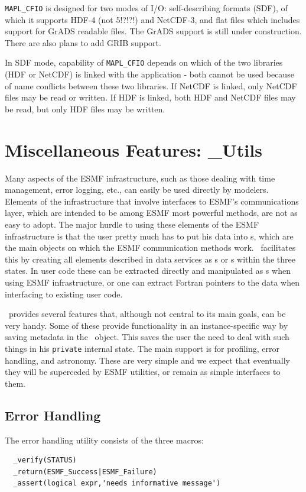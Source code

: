 {\tt MAPL\_CFIO} is designed for two modes of I/O: self-describing formats
(SDF), of which it supports HDF-4 (not 5!?!?!) and NetCDF-3, and flat files
which includes support for GrADS readable files. The GrADS support is still
under construction. There are also plans to add GRIB support. 

In SDF mode, capability of {\tt MAPL\_CFIO} depends on which of the two
libraries (HDF or NetCDF) is linked with the application - both cannot
be used because of name conflicts between these two libraries. If NetCDF is
linked, only NetCDF  files may be read or written. If HDF is linked, both HDF 
and NetCDF files may be read, but only HDF files may be written.


\section{Miscellaneous Features: \ggn\_{Utils}}

Many aspects of the ESMF infrastructure, such as those dealing with
time management, error logging, etc., can easily be used directly by
modelers. Elements of the infrastructure that involve interfaces to
ESMF's communications layer, which are intended to be among ESMF most
powerful methods, are not as easy to adopt. The major hurdle to using
these elements of the ESMF infrastructure is that the user pretty much
has to put his data into \fld s, which are the main objects on
which the ESMF communication methods work. \ggn\  facilitates this by
creating all elements described in data services as \fld s or \bdl s
within the three states. In user code these can be extracted directly
and manipulated as \fld s when using ESMF infrastructure,
or one can extract Fortran pointers to the data when interfacing to 
existing user code. 


\ggn\  provides several features that, although not central to its main 
goals, can be very handy. Some of these provide
functionality in an instance-specific way by saving metadata in the
\ggn\  object. This saves the user the need to deal with such things in
his \texttt{private} internal state. The main support is for profiling, error
handling, and astronomy. These are very simple and we expect that
eventually they will be superceded by ESMF utilities, or remain as
simple interfaces to them.

\subsection{Error Handling}
The error handling utility consists of the three macros:
\begin{verbatim}
  _verify(STATUS)
  _return(ESMF_Success|ESMF_Failure)
  _assert(logical expr,'needs informative message')
\end{verbatim}

